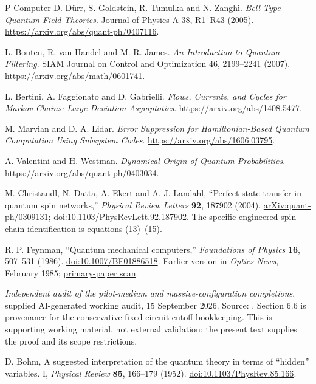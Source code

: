 \documentclass[11pt,oneside,openany]{book}
\theoremstyle{definition}
\theoremstyle{remark}\newtheorem{remark}[theorem]{Remark}
\begin{document}
\begin{thebibliography}{P-Computer}
D. D\"urr, S. Goldstein, R. Tumulka and N. Zangh\`i.
\emph{Bell-Type Quantum Field Theories}.
Journal of Physics A 38, R1--R43 (2005).
\url{https://arxiv.org/abs/quant-ph/0407116}.

L. Bouten, R. van Handel and M. R. James.
\emph{An Introduction to Quantum Filtering}.
SIAM Journal on Control and Optimization 46, 2199--2241 (2007).
\url{https://arxiv.org/abs/math/0601741}.

L. Bertini, A. Faggionato and D. Gabrielli.
\emph{Flows, Currents, and Cycles for Markov Chains: Large Deviation Asymptotics}.
\url{https://arxiv.org/abs/1408.5477}.

M. Marvian and D. A. Lidar.
\emph{Error Suppression for Hamiltonian-Based Quantum Computation Using Subsystem Codes}.
\url{https://arxiv.org/abs/1606.03795}.

A. Valentini and H. Westman.
\emph{Dynamical Origin of Quantum Probabilities}.
\url{https://arxiv.org/abs/quant-ph/0403034}.

M. Christandl, N. Datta, A. Ekert and A. J. Landahl,
``Perfect state transfer in quantum spin networks,''
\emph{Physical Review Letters} \textbf{92}, 187902 (2004).
\href{https://arxiv.org/abs/quant-ph/0309131}{arXiv:quant-ph/0309131};
\href{https://doi.org/10.1103/PhysRevLett.92.187902}{doi:10.1103/PhysRevLett.92.187902}.
The specific engineered spin-chain identification is equations (13)--(15).

R. P. Feynman, ``Quantum mechanical computers,''
\emph{Foundations of Physics} \textbf{16}, 507--531 (1986).
\href{https://doi.org/10.1007/BF01886518}{doi:10.1007/BF01886518}.
Earlier version in \emph{Optics News}, February 1985;
\href{https://www.cs.princeton.edu/courses/archive/fall05/frs119/papers/feynman85_optics_letters.pdf}{primary-paper scan}.

\emph{Independent audit of the pilot-medium and massive-configuration
completions}, supplied AI-generated working audit, 15 September 2026.
Source: .
Section 6.6 is provenance for the conservative fixed-circuit cutoff
bookkeeping. This is supporting working material, not external validation;
the present text supplies the proof and its scope restrictions.

D. Bohm,
A suggested interpretation of the quantum theory in terms of ``hidden'' variables. I,
\emph{Physical Review} \textbf{85}, 166--179 (1952).
\href{https://doi.org/10.1103/PhysRev.85.166}{doi:10.1103/PhysRev.85.166}.


\end{thebibliography}
\end{document}
